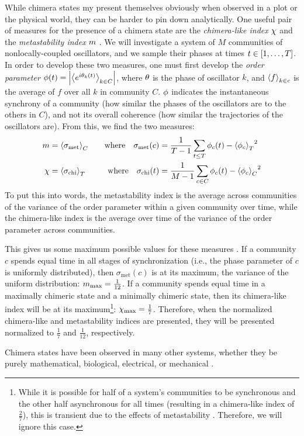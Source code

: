 While chimera states my present themselves obviously when observed in a plot or the physical world, they can be harder to pin down analytically.
One useful pair of measures for the presence of a chimera state are the \textit{chimera-like index} $\chi$ and the \textit{metastability index} $m$ \cite{Shanahan2010,Hizanidis2016}.
We will investigate a system of $M$ communities of nonlocally-coupled oscillators, and we sample their phases at times $t \in \bqty{1, \ldots, T}$.
In order to develop these two measures, one must first develop the \textit{order parameter} $\phi(t) = \abs{\expval{e^{i \theta_{k}(t)}}_{k \in C}}$, where $\theta$ is the phase of oscillator $k$, and $\ev{f}_{k \in c}$ is the average of $f$ over all $k$ in community $C$.
$\phi$ indicates the instantaneous synchrony of a community (how similar the phases of the oscillators are to the others in $C$), and not its overall coherence (how similar the trajectories of the oscillators are).
From this, we find the two measures:
\begin{align}
  \meta
  &=
    \expval{\sigma_{\text{met}}}_{C}
  &
    \qq{where}
    \sigma_{\text{met}}(c)
  &=
    \frac{1}{T - 1} \sum_{t \leq T}{\ordparam_{c}(t) - \expval{\ordparam_{c}}_{T}}^{2} \\
  \chimera
  &=
    \expval{\sigma_{\text{chi}}}_{T}
  &
    \qq{where}
    \sigma_{\text{chi}}(t)
  &=
    \frac{1}{M - 1} \sum_{c \in C}{\ordparam_{c}(t) - \expval{\ordparam_{c}}_{C}}^{2}
\end{align}
To put this into words, the metastability index is the average across communities of the variance of the order parameter within a given community over time, while the chimera-like index is the average over time of the variance of the order parameter across communities.

This gives us some maximum possible values for these measures \cite{Shanahan2010}.
If a community $c$ spends equal time in all stages of synchronization (i.e., the phase parameter of $c$ is uniformly distributed), then $\sigma_{\text{met}}(c)$ is at its maximum, the variance of the uniform distribution: $m_{\text{max}} = \frac{1}{12}$.
If a community spends equal time in a maximally chimeric state and a minimally chimeric state, then its chimera-like index will be at its maximum\footnote{While it is possible for half of a system's communities to be synchronous and the other half asynchronous for all times (resulting in a chimera-like index of $\frac{2}{7}$), this is transient due to the effects of metastability \cite{Shanahan2010}.  Therefore, we will ignore this case.}: $\chi_{\text{max}} = \frac{1}{7}$.
Therefore, when the normalized chimera-like and metastability indices are presented, they will be presented normalized to $\frac{1}{7}$ and $\frac{1}{12}$, respectively.

Chimera states have been observed in many other systems, whether they be purely mathematical, biological, electrical, or mechanical \cite{Shanahan2010,Abrams2004,Andrzejak2016,Hizanidis2016,Kuramoto2002,Martens2013,Panaggio2015,Santos2015,Santos2017,Kruk2018,Xie2014}.

